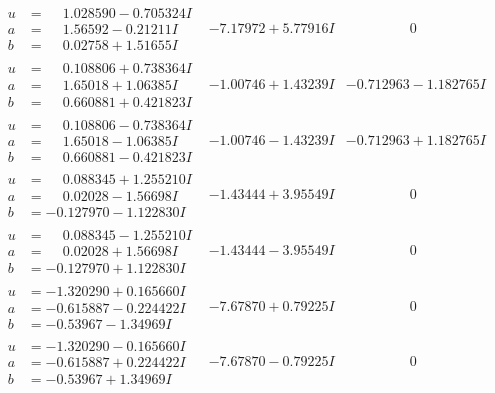 \documentclass[1p]{elsarticle_modified}
\theoremstyle{definition}
\begin{document}
$$\begin{array}{c|c|c}
\begin{aligned}
u &= \phantom{-}1.028590 - 0.705324 I \\
a &= \phantom{-}1.56592 - 0.21211 I \\
b &= \phantom{-}0.02758 + 1.51655 I\end{aligned}
 & -7.17972 + 5.77916 I & \phantom{-0.000000 } 0 \\ \hline\begin{aligned}
u &= \phantom{-}0.108806 + 0.738364 I \\
a &= \phantom{-}1.65018 + 1.06385 I \\
b &= \phantom{-}0.660881 + 0.421823 I\end{aligned}
 & -1.00746 + 1.43239 I & -0.712963 - 1.182765 I \\ \hline\begin{aligned}
u &= \phantom{-}0.108806 - 0.738364 I \\
a &= \phantom{-}1.65018 - 1.06385 I \\
b &= \phantom{-}0.660881 - 0.421823 I\end{aligned}
 & -1.00746 - 1.43239 I & -0.712963 + 1.182765 I \\ \hline\begin{aligned}
u &= \phantom{-}0.088345 + 1.255210 I \\
a &= \phantom{-}0.02028 - 1.56698 I \\
b &= -0.127970 - 1.122830 I\end{aligned}
 & -1.43444 + 3.95549 I & \phantom{-0.000000 } 0 \\ \hline\begin{aligned}
u &= \phantom{-}0.088345 - 1.255210 I \\
a &= \phantom{-}0.02028 + 1.56698 I \\
b &= -0.127970 + 1.122830 I\end{aligned}
 & -1.43444 - 3.95549 I & \phantom{-0.000000 } 0 \\ \hline\begin{aligned}
u &= -1.320290 + 0.165660 I \\
a &= -0.615887 - 0.224422 I \\
b &= -0.53967 - 1.34969 I\end{aligned}
 & -7.67870 + 0.79225 I & \phantom{-0.000000 } 0 \\ \hline\begin{aligned}
u &= -1.320290 - 0.165660 I \\
a &= -0.615887 + 0.224422 I \\
b &= -0.53967 + 1.34969 I\end{aligned}
 & -7.67870 - 0.79225 I & \phantom{-0.000000 } 0\\

\end{array}$$
\end{document}
